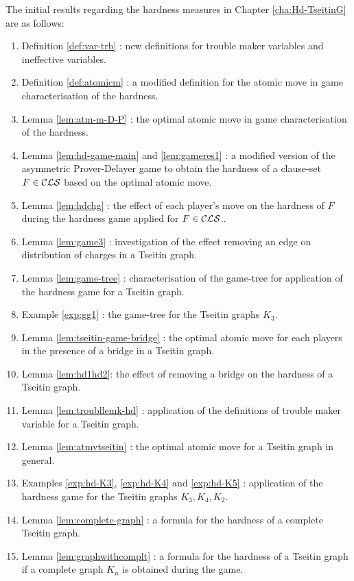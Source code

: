 \documentclass{report}
\begin{document}
The initial results regarding the hardness measures in Chapter \ref{cha:Hd-TseitinG} are as follows:
  \begin{enumerate}
  \item Definition \ref{def:var-trb} : new definitions for trouble maker variables and ineffective variables.
  \item Definition \ref{def:atomicm} : a modified definition for the atomic move in game characterisation of the hardness.
  \item Lemma \ref{lem:atm-m-D-P} : the optimal atomic move in game characterisation of the hardness.
  \item Lemma \ref{lem:hd-game-main} and \ref{lem:gameres1} : a modified version of the asymmetric Prover-Delayer game to obtain the hardness of a clause-set $F \in \mathcal{CLS}$ based on the optimal atomic move.
  \item Lemma \ref{lem:hdchg} : the effect of each player's move on the hardness of $F$ during the hardness game applied for $F \in \mathcal{CLS}$..
  \item Lemma \ref{lem:game3} : investigation of the effect removing an edge on distribution of charges in a Tseitin graph.
  \item Lemma \ref{lem:game-tree} : characterisation of the game-tree for application of the hardness game for a Tseitin graph.
  \item Example \ref{exp:gg1} : the game-tree for the Tseitin graphs $K_3$.
  \item Lemma \ref{lem:tseitin-game-bridge} : the optimal atomic move for each players in the presence of a bridge in a Tseitin graph.
  \item Lemma \ref{lem:hd1hd2}: the effect of removing a bridge on the hardness of a Tseitin graph.
  \item Lemma \ref{lem:troubllemk-hd} : application of the definitions of trouble maker variable for a Tseitin graph.
  \item Lemma \ref{lem:atmvtseitin} : the optimal atomic move for a Tseitin graph in general.
  \item Examples \ref{exp:hd-K3}, \ref{exp:hd-K4} and \ref{exp:hd-K5} : application of the hardness game for the Tseitin graphs $K_3,K_4,K_2$.
  \item Lemma \ref{lem:complete-graph} : a formula for the hardness of a complete Tseitin graph.
  \item Lemma \ref{lem:graphwithcomplt} : a formula for the hardness of a Tseitin graph if a complete graph $K_n$ is obtained during the game.
  \end{enumerate}
\end{document}
